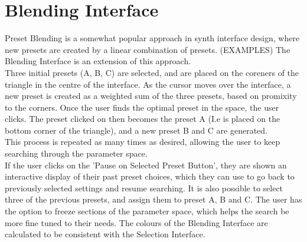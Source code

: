 \documentclass[11pt, oneside]{report}   	%
\begin{document}
\section{Blending Interface}
Preset Blending is a somewhat popular approach in synth interface design, where new presets are created by a linear combination of presets. (EXAMPLES) The Blending Interface is an extension of this approach.\\
Three initial presets (A, B, C) are selected, and are placed on the coreners of the triangle in the centre of the interface. As the cursor moves over the interface, a new preset is created as a weighted sum of the three presets, based on promixity to the corners. Once the user finds the optimal preset in the space, the user clicks. The preset clicked on then becomes the preset A (I.e is placed on the bottom corner of the triangle), and a new preset B and C are generated. \\
This process is repeated as many times as desired, allowing the user to keep searching through the parameter space.\\
If the user clicks on the 'Pause on Selected Preset Button', they are shown an interactive display of their past preset choices, which they can use to go back to previously selected settings and resume searching. It is also possible to select three of the previous presets, and assign them to preset A, B and C.
The user has the option to freeze sections of the parameter space, which helps the search be more fine tuned to their needs.
The colours of the Blending Interface are calculated to be consistent with the Selection Interface.
\end{document}
